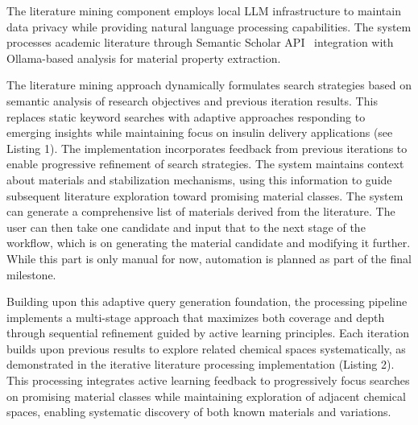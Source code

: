 \documentclass[%
 reprint,
 amsmath,amssymb,
 aps,
]{revtex4-2}
\begin{document}
The literature mining component employs local LLM infrastructure to maintain data privacy while providing natural language processing capabilities. The system processes academic literature through Semantic Scholar API~\cite{lo2020s2orc} integration with Ollama-based analysis for material property extraction.

The literature mining approach dynamically formulates search strategies based on semantic analysis of research objectives and previous iteration results. This replaces static keyword searches with adaptive approaches responding to emerging insights while maintaining focus on insulin delivery applications (see Listing 1). The implementation incorporates feedback from previous iterations to enable progressive refinement of search strategies. The system maintains context about materials and stabilization mechanisms, using this information to guide subsequent literature exploration toward promising material classes. The system can generate a comprehensive list of materials derived from the literature. The user can then take one candidate and input that to the next stage of the workflow, which is on generating the material candidate and modifying it further. While this part is only manual for now, automation is planned as part of the final milestone.

Building upon this adaptive query generation foundation, the processing pipeline implements a multi-stage approach that maximizes both coverage and depth through sequential refinement guided by active learning principles. Each iteration builds upon previous results to explore related chemical spaces systematically, as demonstrated in the iterative literature processing implementation (Listing 2). This processing integrates active learning feedback to progressively focus searches on promising material classes while maintaining exploration of adjacent chemical spaces, enabling systematic discovery of both known materials and variations.
\end{document}
